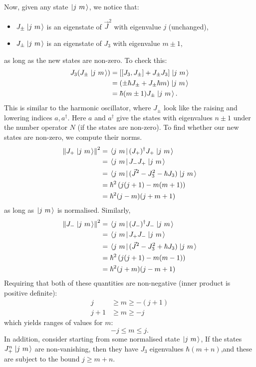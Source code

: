 \documentclass[../Main.tex]{subfiles}
\begin{document}
Now, given any state $\left.\left|j~m\right.\right\rangle$, we notice that:
\begin{itemize}
    \item $J_{\pm} \left.\left|j~m\right.\right\rangle$ is an eigenstate of $\vec{J}^2$ with eigenvalue $j$ (unchanged),
    \item $J_{\pm} \left.\left|j~m\right.\right\rangle$ is an eigenstate of $J_3$ with eigenvalue $m \pm 1$,
\end{itemize}
as long as the new states are non-zero. To check this:
\begin{align*}
    J_3 (J_\pm \left.\left|j~m\right.\right\rangle) &= \left[\left[J_3, J_{\pm}\right] + J_\pm J_3\right]\left.\left|j~m\right.\right\rangle \\
    &= \left(\pm \hbar J_{\pm} + J_{\pm} \hbar m\right) \left.\left|j~m\right.\right\rangle \\
    &= \hbar (m \pm 1) J_\pm \left.\left|j~m\right.\right\rangle.
\end{align*}
This is similar to the harmonic oscillator, where $J_{\pm}$ look like the raising and lowering indices $a, a^\dagger$. Here $a$ and $a^\dagger$ give the states with eigenvalues $n\pm 1$ under the number operator $N$ (if the states are non-zero). To find whether our new states are non-zero, we compute their norms.
\begin{align*}
    \left\|J_+ \left.\left|j~m\right.\right\rangle\right\|^2 &= \left.\left\langle j~m\right.\right| (J_+)^\dagger J_+\left.\left|j~m\right.\right\rangle \\
    &= \left.\left\langle j~m\right.\right| J_- J_+\left.\left|j~m\right.\right\rangle \\
    &= \left.\left\langle j~m\right.\right| (\vec{J}^2 - J_3^2 - \hbar J_3)\left.\left|j~m\right.\right\rangle \\
    &= \hbar^2 \left(j(j+1) - m(m+1)\right) \\
    &= \hbar^2 (j-m)(j + m + 1)
\end{align*}
as long as $\left.\left|j~m\right.\right\rangle$ is normalised. Similarly,
\begin{align*}
    \left\|J_- \left.\left|j~m\right.\right\rangle\right\|^2 &= \left.\left\langle j~m\right.\right| (J_-)^\dagger J_-\left.\left|j~m\right.\right\rangle \\
    &= \left.\left\langle j~m\right.\right| J_+ J_-\left.\left|j~m\right.\right\rangle \\
    &= \left.\left\langle j~m\right.\right| (\vec{J}^2 - J_3^2 + \hbar J_3)\left.\left|j~m\right.\right\rangle \\
    &= \hbar^2 \left(j(j+1) - m(m-1)\right) \\
    &= \hbar^2 (j+m)(j - m + 1)
\end{align*}
Requiring that both of these quantities are non-negative (inner product is positive definite):
\begin{align*}
    j &\geq m \geq -(j+1) \\
    j+1 &\geq m \geq -j
\end{align*}
which yields ranges of values for $m$:
\begin{equation*}
    -j \leq m \leq j.
\end{equation*}
In addition, consider starting from some normalised state $\left.\left|j~m\right.\right\rangle$, If the states $J^n_+ \left.\left|j~m\right.\right\rangle$ are non-vanishing, then they have $J_3$ eigenvalues $\hbar(m + n)$,and these are subject to the bound $j \geq m + n$.
\end{document}
